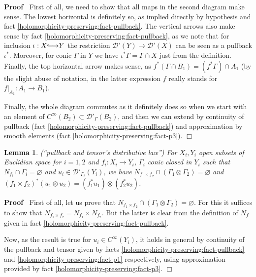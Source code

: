 \documentclass{article}
\newcommand{\longhookrightarrow}{{\lhook\joinrel\relbar\joinrel\rightarrow}}
\newenvironment{proof}{\noindent\textbf{Proof\ }}{\hspace*{\fill}$\Box$\medskip}
\numberwithin{definition}{section}
\newtheorem{lemma}{Lemma}
\numberwithin{lemma}{section}
\numberwithin{proposition}{section}
{\theorembodyfont{\rmfamily}\newtheorem{remark}{Remark}
\numberwithin{remark}{section}
}
\begin{document}
\begin{proof}
  First of all, we need to show that all maps in the second diagram make
  sense. The lowest horizontal is definitely so, as implied directly by
  hypothesis and fact \ref{holomorphicity-preserving:fact-pullback}. The
  vertical arrows also make sense by fact
  \ref{holomorphicity-preserving:fact-pullback}, as we note that for inclusion
  $\iota : X \longhookrightarrow Y$ the restriction $\mathcal{D}' ( Y)
  \rightarrow \mathcal{D}' ( X)$ can be seen as a pullback $\iota^{\ast}$.
  Moreover, for conic $\Gamma$ in $Y$ we have $\iota^{\ast} \Gamma = \Gamma
  \cap X$ just from the definition. Finally, the top horizontal arrow makes
  sense, as $f^{\ast} ( \Gamma \cap B_1) = ( f^{\ast} \Gamma) \cap A_1$ (by
  the slight abuse of notation, in the latter expression $f$ really stands for
  $f |_{A_1} : A_1 \rightarrow B_1$).
  
  Finally, the whole diagram commutes as it definitely does so when we start
  with an element of $C^{\infty} ( B_2) \subset \mathcal{D}'_{\Gamma} ( B_2)$,
  and then we can extend by continuity of pullback (fact
  \ref{holomorphicity-preserving:fact-pullback}) and approximation by smooth
  elements (fact \ref{holomorphicity-preserving:fact-p3}).
\end{proof}

\begin{lemma}
  \label{KR-normalization-recur:lem-pull-distrib-tensor}(``pullback and
  tensor's distributive law'') For $X_i, Y_i$ open subsets of Euclidian space
  for $i = 1, 2$ and $f_i : X_i \rightarrow Y_i$, $\Gamma_i$ conic closed in
  $Y_i$ such that $N_{f_i} \cap \Gamma_i = \varnothing$ and $u_i \in
  \mathcal{D}'_{\Gamma_i} ( Y_i)$, we have $N_{f_1 \times f_2} \cap ( \Gamma_1
  \otimes \Gamma_2) = \varnothing$ and $( f_1 \times f_2)^{\ast} ( u_1 \otimes
  u_2) = ( f_1^{\ast} u_1) \otimes ( f_2^{\ast} u_2)$.
\end{lemma}

\begin{proof}
  First of all, let us prove that $N_{f_1 \times f_2} \cap ( \Gamma_1 \otimes
  \Gamma_2) = \varnothing$. For this it suffices to show that $N_{f_1 \times
  f_2} = N_{f_1} \times N_{f_2}$. But the latter is clear from the definition
  of $N_f$ given in fact \ref{holomorphicity-preserving:fact-pullback}.
  
  Now, as the result is true for $u_i \in C^{\infty} ( Y_i)$, it holds in
  general by continuity of the pullback and tensor given by facts
  \ref{holomorphicity-preserving:fact-pullback} and
  \ref{holomorphicity-preserving:fact-p1} respectively, using approximation
  provided by fact \ref{holomorphicity-preserving:fact-p3}.
\end{proof}
\end{document}
